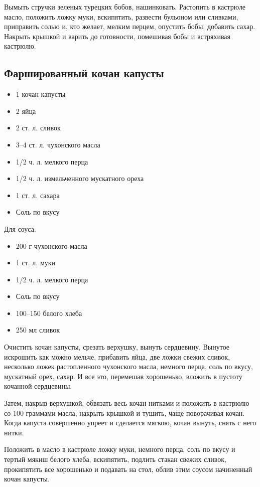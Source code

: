 Вымыть стручки зеленых турецких бобов, нашинковать. Растопить в кастрюле масло, положить ложку муки, вскипятить, развести бульоном или сливками, приправить солью и, кто желает, мелким перцем, опустить бобы, добавить сахар. Накрыть крышкой и варить до готовности, помешивая бобы и встряхивая кастрюлю.

\subsection{Фаршированный кочан капусты}

\begin{itemize}
	\item 1 кочан капусты
    \item 2 яйца
    \item 2 ст. л. сливок 
    \item 3–4 ст. л. чухонского масла
    \item 1/2 ч. л. мелкого перца 
    \item 1/2 ч. л. измельченного мускатного ореха 
    \item 1 ст. л. сахара
    \item Соль по вкусу
\end{itemize}

Для соуса: 

\begin{itemize}
	\item 200 г чухонского масла
    \item 1 ст. л. муки 
    \item 1/2 ч. л. мелкого перца
    \item Соль по вкусу
    \item 100–150 белого хлеба
    \item 250 мл сливок
\end{itemize}

Очистить кочан капусты, срезать верхушку, вынуть сердцевину. Вынутое искрошить как можно мельче, прибавить яйца, две ложки свежих сливок, несколько ложек растопленного чухонского масла, немного перца, соль по вкусу, мускатный орех, сахар. И все это, перемешав хорошенько, вложить в пустоту кочанной сердцевины.

Затем, накрыв верхушкой, обвязать весь кочан нитками и положить в кастрюлю со 100 граммами масла, накрыть крышкой и тушить, чаще поворачивая кочан. Когда капуста совершенно упреет и сделается мягкою, кочан вынуть, снять с него нитки.

Положить в масло в кастрюле ложку муки, немного перца, соль по вкусу и тертый мякиш белого хлеба, вскипятить, подлить стакан свежих сливок, прокипятить все хорошенько и подавать на стол, облив этим соусом начиненный кочан капусты.

